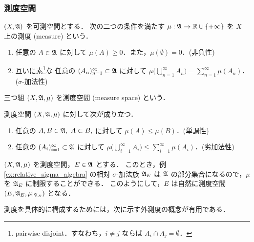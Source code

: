 \subsubsection{測度空間}

\begin{definition}
    $(X,\mathfrak{A})$ を可測空間とする．
    次の二つの条件を満たす $\mu:\mathfrak{A}\to\mathbb{R}\cup\{+\infty\}$ を $X$ 上の測度 (measure) という．
    \begin{enumerate}[label=\textsf{(M\arabic*)},align=left]
        \item\label{item:m1} 任意の $A\in\mathfrak{A}$ に対して $\mu(A)\ge0$．また，$\mu(\emptyset)=0$．\qquad (非負性)
        \item\label{item:m2} 互いに素\footnote{pairwise disjoint．すなわち，$i\ne j$ ならば $A_i\cap A_j=\emptyset$．}な
            任意の $(A_n)_{n=1}^\infty\subset\mathfrak{A}$ に対して
            $\displaystyle\mu\biggl(\bigcup_{n=1}^\infty A_n\biggr)=\sum_{n=1}^\infty\mu(A_n)$．\qquad ($\sigma$-加法性)
    \end{enumerate}
    三つ組 $(X,\mathfrak{A},\mu)$ を測度空間 (measure space) という．
\end{definition}

\begin{remark}
    測度空間 $(X,\mathfrak{A},\mu)$ に対して次が成り立つ．
    \begin{enumerate}
        \item 任意の $A,B\in\mathfrak{A},\ A\subset B,$ に対して $\mu(A)\le\mu(B)$．\qquad(単調性)
        \item 任意の $(A_i)_{i=1}^\infty\subset\mathfrak{A}$ に対して $\displaystyle\mu\biggl(\bigcup_{i=1}^\infty A_i\biggr)\le\sum_{i=1}^\infty\mu(A_i)$．\qquad(劣加法性)
    \end{enumerate}
\end{remark}

\begin{example}\label{ex:restriction_of_measure}
    $(X,\mathfrak{A},\mu)$ を測度空間，$E\in\mathfrak{A}$ とする．
    このとき，例 \ref{ex:relative_sigma_algebra} の相対 $\sigma$-加法族 $\mathfrak{A}_E$ は
    $\mathfrak{A}$ の部分集合になるので，$\mu$ を $\mathfrak{A}_E$ に制限することができる．
    このようにして，$E$ は自然に測度空間 $(E,\mathfrak{A}_E,\mu\vert_{\mathfrak{A}_E})$ となる．
\end{example}

測度を具体的に構成するためには，次に示す外測度の概念が有用である．

